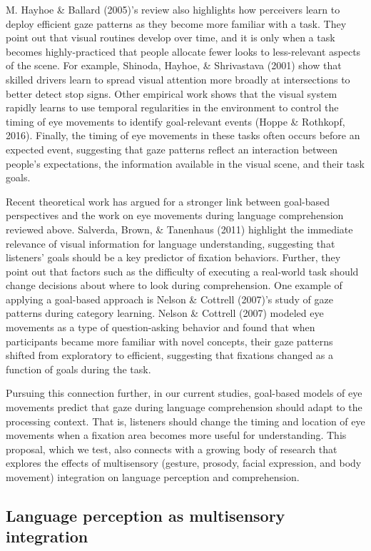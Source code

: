 \documentclass[oneside]{report}
\begin{document}
M. Hayhoe \& Ballard (2005)'s review also highlights how perceivers
learn to deploy efficient gaze patterns as they become more familiar
with a task. They point out that visual routines develop over time, and
it is only when a task becomes highly-practiced that people allocate
fewer looks to less-relevant aspects of the scene. For example, Shinoda,
Hayhoe, \& Shrivastava (2001) show that skilled drivers learn to spread
visual attention more broadly at intersections to better detect stop
signs. Other empirical work shows that the visual system rapidly learns
to use temporal regularities in the environment to control the timing of
eye movements to identify goal-relevant events (Hoppe \& Rothkopf,
2016). Finally, the timing of eye movements in these tasks often occurs
before an expected event, suggesting that gaze patterns reflect an
interaction between people's expectations, the information available in
the visual scene, and their task goals.

Recent theoretical work has argued for a stronger link between
goal-based perspectives and the work on eye movements during language
comprehension reviewed above. Salverda, Brown, \& Tanenhaus (2011)
highlight the immediate relevance of visual information for language
understanding, suggesting that listeners' goals should be a key
predictor of fixation behaviors. Further, they point out that factors
such as the difficulty of executing a real-world task should change
decisions about where to look during comprehension. One example of
applying a goal-based approach is Nelson \& Cottrell (2007)'s study of
gaze patterns during category learning. Nelson \& Cottrell (2007)
modeled eye movements as a type of question-asking behavior and found
that when participants became more familiar with novel concepts, their
gaze patterns shifted from exploratory to efficient, suggesting that
fixations changed as a function of goals during the task.

Pursuing this connection further, in our current studies, goal-based
models of eye movements predict that gaze during language comprehension
should adapt to the processing context. That is, listeners should change
the timing and location of eye movements when a fixation area becomes
more useful for understanding. This proposal, which we test, also
connects with a growing body of research that explores the effects of
multisensory (gesture, prosody, facial expression, and body movement)
integration on language perception and comprehension.

\subsection{Language perception as multisensory
integration}\label{language-perception-as-multisensory-integration}
\end{document}
